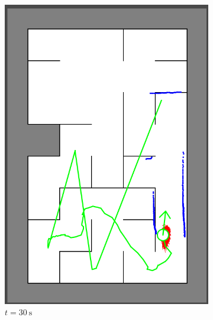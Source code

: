 \begin{figure}[H]
\begin{subfigure}{0.2\textwidth}
         \includegraphics[width=\textwidth]{figures/localization_30s.png}
         \caption{$t = \SI{30}{\second}$}
         \label{mapping20s}
     \end{subfigure}
     \hspace{1em}
     \begin{subfigure}{0.2\textwidth}
         \centering

\end{subfigure}
\end{figure}
